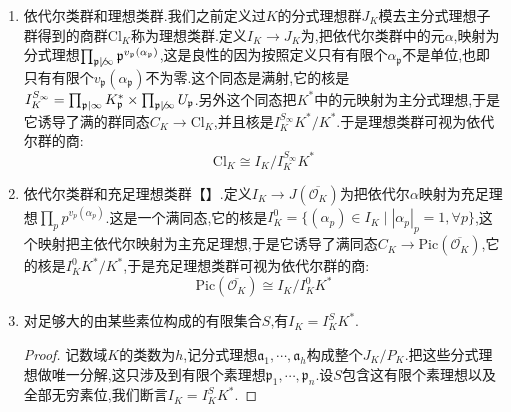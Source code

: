\begin{enumerate}
\begin{proof}
		对$p\in S_f$,设$K$的类数是$h$,那么$p^h\in i(K^S)$,这说明$J(S_f)^h\subseteq i(K^S)\subseteq J(S_f)$.这里$J(S_f)^h$和$J(S_f)$的秩都是$|S_f|$,导致$i(K^S)$也是.在上面正合列中$i$的像的秩是$|S_f|$,它的核$\mathrm{Im}(\lambda')$的秩是$|S_{\infty}|-1$(这也是Dirichlet单位定理的部分结论),于是$\mathrm{Im}(\lambda)$是秩为$|S_f|+|S_{\infty}|-1=s-1$的格.最后按照我们证明过的$\prod_{p\in S}|a|_p=\prod_p|a|_p=1,a\in K^S$,得到$\mathrm{Im}(\lambda)$落在$s-1$维迹零空间$H$中.
	\end{proof}
    \item 依代尔类群和理想类群.我们之前定义过$K$的分式理想群$J_K$模去主分式理想子群得到的商群$\mathrm{Cl}_K$称为理想类群.定义$I_K\to J_K$为,把依代尔类群中的元$\alpha$,映射为分式理想$\prod_{\mathfrak{p}\not\mid\infty}\mathfrak{p}^{v_{\mathfrak{p}}(\alpha_\mathfrak{p})}$,这是良性的因为按照定义只有有限个$\alpha_{\mathfrak{p}}$不是单位,也即只有有限个$v_{\mathfrak{p}}(\alpha_{\mathfrak{p}})$不为零.这个同态是满射,它的核是$I_K^{S_{\infty}}=\prod_{\mathfrak{p}\mid\infty}K_{\mathfrak{p}}^*\times\prod_{\mathfrak{p}\not\mid\infty}U_{\mathfrak{p}}$.另外这个同态把$K^*$中的元映射为主分式理想,于是它诱导了满的群同态$C_K\to\mathrm{Cl}_K$,并且核是$I_K^{S_{\infty}}K^*/K^*$.于是理想类群可视为依代尔群的商:
    $$\mathrm{Cl}_K\cong I_K/I_K^{S_{\infty}}K^*$$
    \item 依代尔类群和充足理想类群【】.定义$I_K\to J(\overline{\mathscr{O}_K})$为把依代尔$\alpha$映射为充足理想$\prod_pp^{v_p(\alpha_p)}$.这是一个满同态,它的核是$I_K^0=\{(\alpha_p)\in I_K\mid|\alpha_p|_p=1,\forall p\}$,这个映射把主依代尔映射为主充足理想,于是它诱导了满同态$C_K\to\mathrm{Pic}(\overline{\mathscr{O}_K})$,它的核是$I_K^0K^*/K^*$,于是充足理想类群可视为依代尔群的商:
    $$\mathrm{Pic}(\overline{\mathscr{O}_K})\cong I_K/I^0_KK^*$$
    \item 对足够大的由某些素位构成的有限集合$S$,有$I_K=I_K^SK^*$.
    \begin{proof}
    	
    	记数域$K$的类数为$h$,记分式理想$\mathfrak{a}_1,\cdots,\mathfrak{a}_h$构成整个$J_K/P_K$.把这些分式理想做唯一分解,这只涉及到有限个素理想$\mathfrak{p}_1,\cdots,\mathfrak{p}_n$.设$S$包含这有限个素理想以及全部无穷素位,我们断言$I_K=I_K^SK^*$.
    	
    	\qquad
    	

\end{proof}
\end{enumerate}
